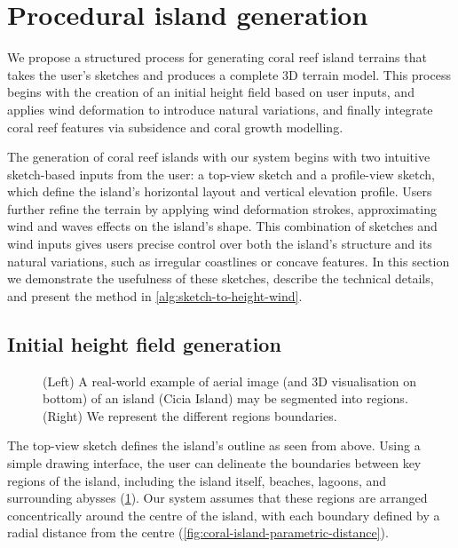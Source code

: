 \section{Procedural island generation}
\label{sec:coral-island-example-generation}

We propose a structured process for generating coral reef island terrains that takes the user's sketches and produces a complete 3D terrain model. This process begins with the creation of an initial height field based on user inputs, and applies wind deformation to introduce natural variations, and finally integrate coral reef features via subsidence and coral growth modelling.

The generation of coral reef islands with our system begins with two intuitive sketch-based inputs from the user: a top-view sketch and a profile-view sketch, which define the island's horizontal layout and vertical elevation profile. Users further refine the terrain by applying wind deformation strokes, approximating wind and waves effects on the island's shape. This combination of sketches and wind inputs gives users precise control over both the island's structure and its natural variations, such as irregular coastlines or concave features. In this section we demonstrate the usefulness of these sketches, describe the technical details, and present the method in \cref{alg:sketch-to-height-wind}.

\subsection{Initial height field generation}
\label{sec:coral-island-generation-initial}

\begin{figure}
    \caption[A real island and its different regions]{(Left) A real-world example of aerial image (and 3D visualisation on bottom) of an island (Cicia Island) may be segmented into regions. (Right) We represent the different regions boundaries.}
    \label{fig:coral-island-top-view-sketch}
\end{figure}

The top-view sketch defines the island's outline as seen from above. Using a simple drawing interface, the user can delineate the boundaries between key regions of the island, including the island itself, beaches, lagoons, and surrounding abysses (\cref{fig:coral-island-top-view-sketch}). Our system assumes that these regions are arranged concentrically around the centre of the island, with each boundary defined by a radial distance from the centre (\cref{fig:coral-island-parametric-distance}).

